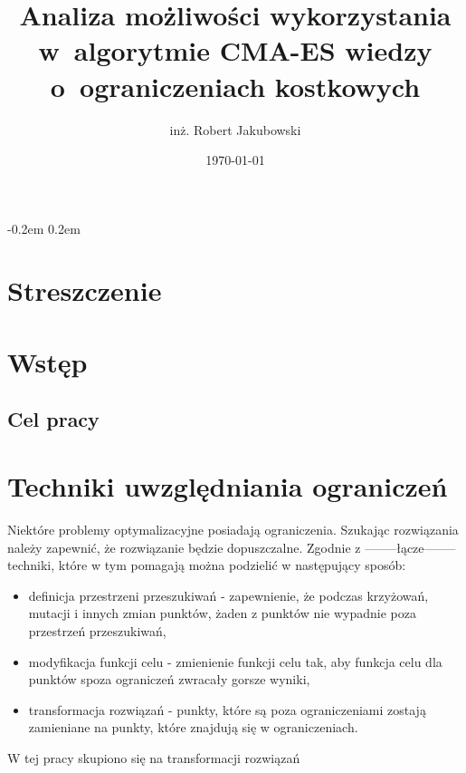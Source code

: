 \documentclass{mini}
\title{Analiza możliwości wykorzystania w~algorytmie CMA-ES wiedzy o~ograniczeniach kostkowych}
\author{inż. Robert Jakubowski}
\date{\today}
\begin{document}
\maketitle

\pagebreak
\thispagestyle{empty}

\openup -0.2em %
\tableofcontents 
\openup 0.2em %

\thispagestyle{empty}
\raggedbottom
\pagebreak


\section{Streszczenie}

\pagebreak

\section{Wstęp}

\subsection{Cel pracy}

\pagebreak

\section{Techniki uwzględniania ograniczeń}
Niektóre problemy optymalizacyjne posiadają ograniczenia. Szukając rozwiązania należy zapewnić, że rozwiązanie będzie dopuszczalne. Zgodnie z --------łącze-------- techniki, które w tym pomagają można podzielić w następujący sposób:
\begin{itemize}[noitemsep]
\item definicja przestrzeni przeszukiwań - zapewnienie, że podczas krzyżowań, mutacji i innych zmian punktów, żaden z punktów nie wypadnie poza przestrzeń przeszukiwań,
\item modyfikacja funkcji celu - zmienienie funkcji celu tak, aby funkcja celu dla punktów spoza ograniczeń zwracały gorsze wyniki,
\item transformacja rozwiązań - punkty, które są poza ograniczeniami zostają zamieniane na punkty, które znajdują się w ograniczeniach.
\end{itemize}

W tej pracy skupiono się na transformacji rozwiązań
\end{document}
